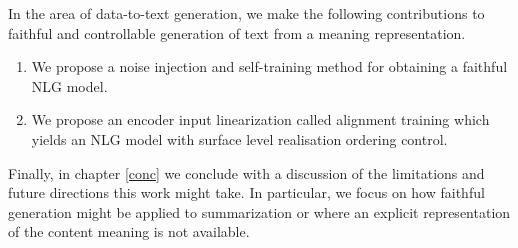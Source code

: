       In the area of data-to-text generation, we make the following 
      contributions to faithful and controllable generation of 
      text from a meaning representation. 
      \begin{enumerate}
          \item We propose a noise injection and self-training method
              for obtaining a faithful NLG model.
          \item We propose an encoder input linearization called alignment
              training which  yields an NLG model with surface level
              realisation ordering control.
      \end{enumerate}
  
  
  Finally, in chapter \autoref{conc} we conclude with a discussion of the 
  limitations and future 
  directions this work might take. In particular, we focus on how 
  faithful generation might be applied to summarization or \machinetranslation
  where an explicit representation of the content meaning is not available. 
